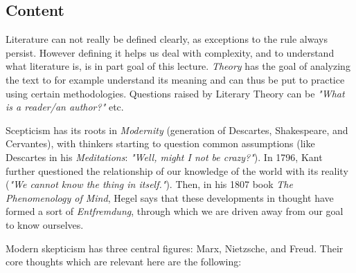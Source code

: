 \documentclass[]{scrartcl}
\begin{document}
\subsection{Content}
\vspace{15pt}

Literature can not really be defined clearly, as exceptions to the rule always persist. However defining it helps us deal with complexity, and to understand what literature is, is in part goal of this lecture. \emph{Theory} has the goal of analyzing the text to for example understand its meaning and can thus be put to practice using certain methodologies. Questions raised by Literary Theory can be \emph{"What is a reader/an author?"} etc.

Scepticism has its roots in \emph{Modernity} (generation of Descartes, Shakespeare, and Cervantes), with thinkers starting to question common assumptions (like Descartes in his \emph{Meditations}: \emph{"Well, might I not be crazy?"}). In 1796, Kant further questioned the relationship of our knowledge of the world with its reality (\emph{"We cannot know the thing in itself."}). Then, in his 1807 book \emph{The Phenomenology of Mind}, Hegel says that these developments in thought have formed a sort of \emph{Entfremdung}, through which we are driven away from our goal to know ourselves.

Modern skepticism has three central figures: Marx, Nietzsche, and Freud. Their core thoughts which are relevant here are the following:
\end{document}
